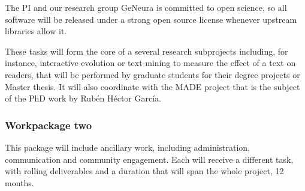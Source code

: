 \documentclass[a4paper,12pt,twocolumn]{article}
\begin{document}
The PI and our research group GeNeura is committed to open science, so
all software will be released under a strong open source license
whenever upstream libraries allow it.

These tasks will form the core of a several research subprojects
including, for instance, interactive evolution or text-mining to
measure the effect of a text on readers, that will be performed by
graduate students for their degree projects or Master thesis. It will
also coordinate with the MADE project that is the subject of the PhD
work by Rubén Héctor García. 

\subsubsection{Workpackage two}

This package will include ancillary work, including administration,
communication and community engagement. Each will receive a different
task, with rolling deliverables and a duration that will span the
whole project, 12 months.
\end{document}
